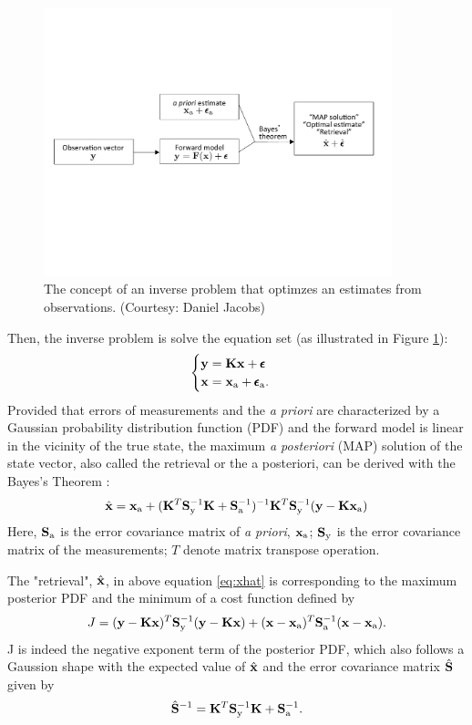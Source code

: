 \begin{figure}[t]
  \centering
  \includegraphics[width={0.9\textwidth}]{figures/MAP.pdf}
  \caption{The concept of an inverse problem that optimzes an estimates
from observations. (Courtesy: Daniel Jacobs)}
  \label{fig:map}
\end{figure}

Then, the inverse problem is solve the equation set (as
illustrated in Figure \ref{fig:map}):
\begin{equation}
\begin{cases}
\mathbf{y} = \mathbf{K}\mathbf{x} + \pmb{\epsilon} \\
\mathbf{x} = \mathbf{x}_\text{a} + \pmb{\epsilon}_\text{a}.
\end{cases}
\label{eq:inverse2}
\end{equation}
Provided that errors of measurements and the \textit{a priori} are characterized
by a Gaussian probability distribution function (PDF) and the forward
model is linear in the vicinity of the true state, the maximum
\textit{a posteriori} (MAP) solution of the state vector, also called the retrieval or
the a posteriori, can be derived with the Bayes's Theorem
\citep{Rodgers00}:
\begin{equation}
\hat{\mathbf{x}} = \mathbf{x}_\text{a} + (\mathbf{K}^T\mathbf{S}_\text{y}^{-1}\mathbf{K}+\mathbf{S}_\text{a}^{-1})^{-1}
\mathbf{K}^T\mathbf{S}_\text{y}^{-1}(\mathbf{y}-\mathbf{K}\mathbf{x}_\text{a}) \label{eq:xhat}
\end{equation}
Here, $\mathbf{S}_\text{a}$ is the error covariance matrix of \textit{a priori},
$\mathbf{x}_\text{a}$; $\mathbf{S}_\text{y}$ is the error covariance matrix of the
measurements; $T$ denote matrix transpose operation. 

The "retrieval", $\hat{\mathbf{x}}$, in above equation \eqref{eq:xhat}
is corresponding to the maximum posterior
PDF and the minimum of a cost function defined by
\begin{equation}
J = (\mathbf{y}-\mathbf{K}\mathbf{x})^T\mathbf{S}_\text{y}^{-1}(\mathbf{y}-\mathbf{K}\mathbf{x}) +
    (\mathbf{x}-\mathbf{x}_\text{a})^T\mathbf{S}_\text{a}^{-1}(\mathbf{x}-\mathbf{x}_\text{a}).
\label{eq:cost2}
\end{equation} 
J is indeed the negative exponent term of the posterior PDF, which also
follows a Gaussion shape with the expected value of $\hat{\mathbf{x}}$ and
the error covariance matrix $\hat{\mathbf{S}}$ given by
\begin{equation}
\hat{\mathbf{S}}^{-1} = \mathbf{K}^T\mathbf{S}_\text{y}^{-1}\mathbf{K}+\mathbf{S}_\text{a}^{-1}. \label{eq:shat}
\end{equation}


